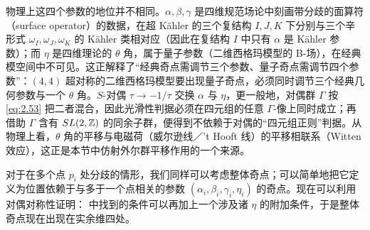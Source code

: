 \begin{yizhu}[物理图像补充]
物理上这四个参数的地位并不相同。$\alpha,\beta,\gamma$ 是四维规范场论中刻画带分歧的面算符（surface operator）的数据，在超 Kähler 的三个复结构 $I,J,K$ 下分别与三个辛形式 $\omega_I,\omega_J,\omega_K$ 的 Kähler 类相对应（因此在复结构 $I$ 中只有 $\alpha$ 是 Kähler 参数）；而 $\eta$ 是四维理论的 $\theta$ 角，属于量子参数（二维西格玛模型的 B-场），在经典模空间中不可见。这正解释了“经典奇点需调节三个参数、量子奇点需调节四个参数”：$(4,4)$ 超对称的二维西格玛模型要出现量子奇点，必须同时调节三个经典几何参数与一个 $\theta$ 角。$S$-对偶 $\tau\to-1/\tau$ 交换 $\alpha$ 与 $\eta$，更一般地，对偶群 $\Gamma$ 按 \eqref{eq:2.53} 把二者混合，因此光滑性判据必须在四元组的任意 $\Gamma$-像上同时成立；再借助 $\Gamma$ 含有 $SL(2,{\mathbb{Z}})$ 的同余子群，便得到不依赖于对偶的“四元组正则”判据。从物理上看，$\theta$ 角的平移与电磁荷（威尔逊线／'t Hooft 线）的平移相联系（Witten 效应），这正是本节中仿射外尔群平移作用的一个来源。
\end{yizhu}

对于在多个点 $p_i$ 处分歧的情形，我们同样可以考虑整体奇点；可以简单地把它定义为位置依赖于与多于一个点相关的参数 $(\alpha_i,\beta_i,\gamma_i,\eta_i)$ 的奇点。现在可以利用对偶对称性证明：\cite{ref24} 中找到的条件可以再加上一个涉及诸 $\eta$ 的附加条件，于是整体奇点现在出现在实余维四处。
